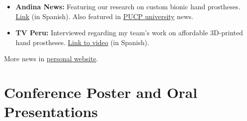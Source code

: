 \documentclass[a4paper,10pt]{article}
\begin{document}
\begin{itemize}
  \item \textbf{Andina News:} Featuring our research on custom bionic hand prostheses.
        \href{https://andina.pe/agencia/noticia-investigadores-fabrican-protesis-mioelectrica-personalizada-mano-832760.aspx}{Link}
        (in Spanish). Also featured in
        \href{https://puntoedu.pucp.edu.pe/noticia/manos-inteligentes/}{PUCP university} news.

  \item \textbf{TV Peru:} Interviewed regarding my team's work on affordable 3D-printed hand
        prostheses.
        \href{https://www.youtube.com/watch?v=WlIK1LMIvh8&t=13s}{Link to video} (in Spanish).
\end{itemize}

More news in \href{https://renatomio.github.io/news/}{personal website}.

\section{Conference Poster and Oral Presentations}
\end{document}
